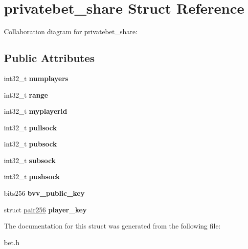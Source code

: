 \hypertarget{structprivatebet__share}{}\section{privatebet\+\_\+share Struct Reference}
\label{structprivatebet__share}


Collaboration diagram for privatebet\+\_\+share\+:
\subsection*{Public Attributes}
\begin{DoxyCompactItemize}
\item 
\mbox{\label{structprivatebet__share_a68fd85a4a8e37ea44874f539eae7b351}} 
int32\+\_\+t {\bfseries numplayers}
\item 
\mbox{\label{structprivatebet__share_a3cf44241e4e8ce86848648d66dae414a}} 
int32\+\_\+t {\bfseries range}
\item 
\mbox{\label{structprivatebet__share_a7ed135d259a8397ff4d14873d2a3eee9}} 
int32\+\_\+t {\bfseries myplayerid}
\item 
\mbox{\label{structprivatebet__share_aae07563369523806f9ac464dba5a0213}} 
int32\+\_\+t {\bfseries pullsock}
\item 
\mbox{\label{structprivatebet__share_add6af3c7c7347f299ba30405ebd4ebc0}} 
int32\+\_\+t {\bfseries pubsock}
\item 
\mbox{\label{structprivatebet__share_a4214acb498a8560837dea48ee40a2746}} 
int32\+\_\+t {\bfseries subsock}
\item 
\mbox{\label{structprivatebet__share_af3be21301f453b7db1c634ac4edfe1ce}} 
int32\+\_\+t {\bfseries pushsock}
\item 
\mbox{\label{structprivatebet__share_ac6419dd53a9675112380945ecc31df2d}} 
bits256 {\bfseries bvv\+\_\+public\+\_\+key}
\item 
\mbox{\label{structprivatebet__share_a890a65950223041a020fe0dd905c6991}} 
struct \hyperlink{structpair256}{pair256} {\bfseries player\+\_\+key}
\end{DoxyCompactItemize}


The documentation for this struct was generated from the following file\+:\begin{DoxyCompactItemize}
\item 
bet.\+h\end{DoxyCompactItemize}
